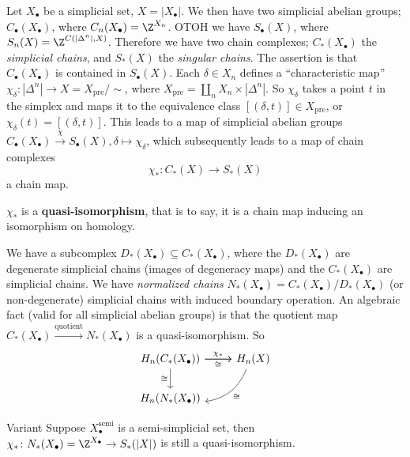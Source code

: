     Let $X_{\bullet}$ be a simplicial set, $X=|X_{\bullet}|$. We then have two simplicial abelian groups; $C_{\bullet}(X_{\bullet})$, where $C_n (X_{\bullet})=\Z^{X_n }$. OTOH  we have $S_{\bullet}(X)$, where $S_n (X) = \Z^{C(|\Delta ^n |,X)}$. Therefore we have two chain complexes; $C_*(X_{\bullet})$ the \emph{simplicial chains}, and $S_*(X)$ the \emph{singular chains}. The assertion is that $C_{\bullet}(X_{\bullet})$ is contained in $S_{\bullet}(X)$. Each $\delta  \in X_n $ defines a ``characteristic map'' $\chi_{\delta }\colon |\Delta ^n | \to X=X_{\mathrm{pre}}/\sim$, where $X_{\mathrm{pre}}=\coprod_n X_n \times |\Delta ^n |$. So $\chi_{\delta }$ takes a point $t$ in the simplex and maps it to the equivalence class $[(\delta, t)] \in  X_{\mathrm{pre}}$, or $\chi_{\delta}(t)=[(\delta, t)]$. This leads to a map of simplicial abelian groups $C_{\bullet}(X_{\bullet}) \xrightarrow{\chi} S_{\bullet}(X), \delta \mapsto \chi_{\delta }$, which subsequently leads to a map of chain complexes \[
        \chi_* \colon C_*(X) \to S_*(X)
    \] a chain map.
    \begin{theorem}
        $\chi_*$ is a \textbf{quasi-isomorphism}, that is to say, it is a chain map inducing an isomorphism on homology.
    \end{theorem}
    We have a subcomplex $D_*(X_{\bullet}) \subseteq C_*(X_{\bullet})$, where the $D_*(X_{\bullet})$ are degenerate simplicial chains (images of degeneracy maps) and the $C_*(X_{\bullet})$ are simplicial chains. We have \emph{normalized chains}  $N_*(X_{\bullet}) = C_*(X_{\bullet}) / D_*(X_{\bullet})$ (or non-degenerate) simplicial chains with induced boundary operation. An algebraic fact (valid for all simplicial abelian groups) is that the quotient map $C_*(X_{\bullet}) \xrightarrow{\text{quotient}} N_*(X_{\bullet})$ is a quasi-isomorphism. So \[
\begin{tikzcd} 
    H_n(C_*(X_{\bullet})) \arrow[d, "\cong"'] \arrow[r, "\chi_*"] \arrow[r, "\cong"'] & H_n(X) \arrow[ld, "\cong", bend left] \\
H_n(N_*(X_{\bullet}))                                                             &                                      
\end{tikzcd}
    \] 
\begin{namedthing}{Variant} 
    Suppose $X_{\bullet}^{\mathrm{semi}}$ is a semi-simplicial set, then $\chi_* \colon N_*(X_{\bullet})=\Z^{X_{\bullet}} \to S_*(|X|)$ is still a quasi-isomorphism.
\end{namedthing}
